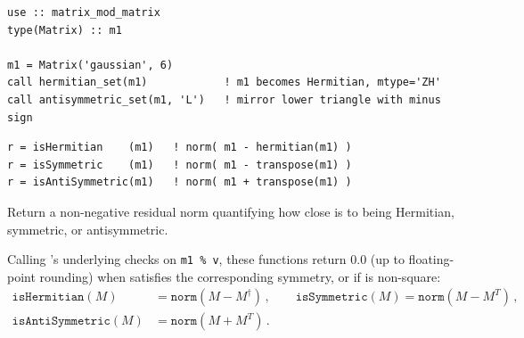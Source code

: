 \begin{description}[leftmargin=2.2cm, style=nextline]
\end{description}

\lstset{language=[95]Fortran}
\begin{lstlisting}
use :: matrix_mod_matrix
type(Matrix) :: m1

m1 = Matrix('gaussian', 6)
call hermitian_set(m1)            ! m1 becomes Hermitian, mtype='ZH'
call antisymmetric_set(m1, 'L')   ! mirror lower triangle with minus sign
\end{lstlisting}


\lstset{language=[95]Fortran}
\begin{lstlisting}
r = isHermitian    (m1)   ! norm( m1 - hermitian(m1) )
r = isSymmetric    (m1)   ! norm( m1 - transpose(m1) )
r = isAntiSymmetric(m1)   ! norm( m1 + transpose(m1) )
\end{lstlisting}

Return a non-negative  residual norm quantifying how close  is to being Hermitian, symmetric, or antisymmetric.

Calling 's underlying checks on \texttt{m1 \% v}, these functions return $0.0$ (up to floating-point rounding) when  satisfies the corresponding symmetry, or  if  is non-square:
\begin{align}
  \texttt{isHermitian}(M)     &= \texttt{norm}(M - M^\dagger)\, , \qquad
  \texttt{isSymmetric}(M)      = \texttt{norm}(M - M^T)\, , \nonumber \\
  \texttt{isAntiSymmetric}(M) &= \texttt{norm}(M + M^T)\, .
\end{align}

